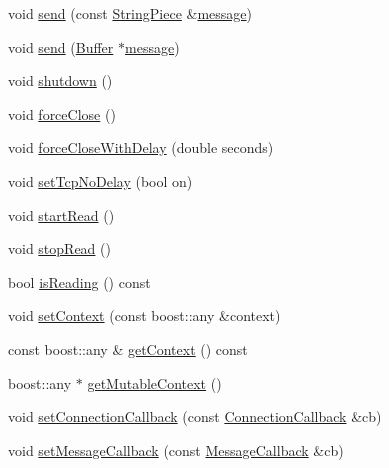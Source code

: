\begin{DoxyCompactItemize}
\item 
void \hyperlink{classmuduo_1_1net_1_1TcpConnection_a6204afa3a5014326827f59119b62e0f2}{send} (const \hyperlink{classmuduo_1_1StringPiece}{String\+Piece} \&\hyperlink{test13_8cc_a36bd74109f547f7f8198faf5a12d2879}{message})
\item 
void \hyperlink{classmuduo_1_1net_1_1TcpConnection_a92d6542b89b04de2d77fc25b34ccb9dc}{send} (\hyperlink{classmuduo_1_1net_1_1Buffer}{Buffer} $\ast$\hyperlink{test13_8cc_a36bd74109f547f7f8198faf5a12d2879}{message})
\item 
void \hyperlink{classmuduo_1_1net_1_1TcpConnection_a7861ee1569802186a619778efc85af13}{shutdown} ()
\item 
void \hyperlink{classmuduo_1_1net_1_1TcpConnection_a0ba4cd267f7415c7ae91516b4545eda4}{force\+Close} ()
\item 
void \hyperlink{classmuduo_1_1net_1_1TcpConnection_a1400e984896abdc7b716ebaa8a6ea694}{force\+Close\+With\+Delay} (double seconds)
\item 
void \hyperlink{classmuduo_1_1net_1_1TcpConnection_a7419d5072b837a2ba3cc5aac85015212}{set\+Tcp\+No\+Delay} (bool on)
\item 
void \hyperlink{classmuduo_1_1net_1_1TcpConnection_a2fb6cbd3d3abf25782d51457ab157b24}{start\+Read} ()
\item 
void \hyperlink{classmuduo_1_1net_1_1TcpConnection_a36b0d441712db3b0e94cead68e9ff10a}{stop\+Read} ()
\item 
bool \hyperlink{classmuduo_1_1net_1_1TcpConnection_ad1585484cec92cacd15885c798456205}{is\+Reading} () const
\item 
void \hyperlink{classmuduo_1_1net_1_1TcpConnection_a332ba7a521a446572051bc6939f4c4fa}{set\+Context} (const boost\+::any \&context)
\item 
const boost\+::any \& \hyperlink{classmuduo_1_1net_1_1TcpConnection_aa6a547152bf0e64f8e18dc7146094e1f}{get\+Context} () const
\item 
boost\+::any $\ast$ \hyperlink{classmuduo_1_1net_1_1TcpConnection_aca752855bdbb8cc6b18d05be1286b8f1}{get\+Mutable\+Context} ()
\item 
void \hyperlink{classmuduo_1_1net_1_1TcpConnection_abbb0008856a8495adb08c8cb7fe65c2c}{set\+Connection\+Callback} (const \hyperlink{namespacemuduo_1_1net_a78754792e997a13cb10908eb7ec508b2}{Connection\+Callback} \&cb)
\item 
void \hyperlink{classmuduo_1_1net_1_1TcpConnection_a0a67f11f92b4cdc6f6c66b861f81cb08}{set\+Message\+Callback} (const \hyperlink{namespacemuduo_1_1net_acaa802028467a41738aeb49699e85285}{Message\+Callback} \&cb)

\end{DoxyCompactItemize}
